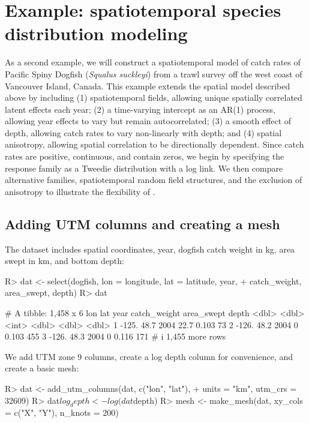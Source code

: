 \documentclass[article]{jss}\usepackage[]{graphicx}\usepackage[dvipsnames]{xcolor}
\newcommand{\sdmTMB}{\pkg{sdmTMB}}
\begin{document}
\section{Example: spatiotemporal species distribution modeling}\label{dogfish}

As a second example, we will construct a spatiotemporal model of catch rates of Pacific Spiny Dogfish (\emph{Squalus suckleyi}) from a trawl survey off the west coast of Vancouver Island, Canada.
This example extends the spatial model described above by including (1) spatiotemporal fields, allowing unique spatially correlated latent effects each year; (2) a time-varying intercept as an AR(1) process, allowing year effects to vary but remain autocorrelated; (3) a smooth effect of depth, allowing catch rates to vary non-linearly with depth; and (4) spatial anisotropy, allowing spatial correlation to be directionally dependent.
Since catch rates are positive, continuous, and contain zeros, we begin by specifying the response family as a Tweedie distribution \citep{tweedie1984} with a log link.
We then compare alternative families, spatiotemporal random field structures, and the exclusion of anisotropy to illustrate the flexibility of \sdmTMB.

\subsection{Adding UTM columns and creating a mesh}

The dataset includes spatial coordinates, year, dogfish catch weight in kg, area swept in km, and bottom depth:

\begin{Schunk}
\begin{Sinput}
R> dat <- select(dogfish, lon = longitude, lat = latitude, year,
+    catch_weight, area_swept, depth)
R> dat
\end{Sinput}
\begin{Soutput}
# A tibble: 1,458 x 6
    lon   lat  year catch_weight area_swept depth
  <dbl> <dbl> <int>        <dbl>      <dbl> <dbl>
1 -125.  48.7  2004         22.7      0.103    73
2 -126.  48.2  2004          0        0.103   455
3 -126.  48.3  2004          0        0.116   171
# i 1,455 more rows
\end{Soutput}
\end{Schunk}

We add UTM zone 9 columns, create a log depth column for convenience, and create a basic mesh:

\begin{Schunk}
\begin{Sinput}
R> dat <- add_utm_columns(dat, c("lon", "lat"),
+    units = "km", utm_crs = 32609)
R> dat$log_depth <- log(dat$depth)
R> mesh <- make_mesh(dat, xy_cols = c("X", "Y"), n_knots = 200)
\end{Sinput}
\end{Schunk}
\end{document}
